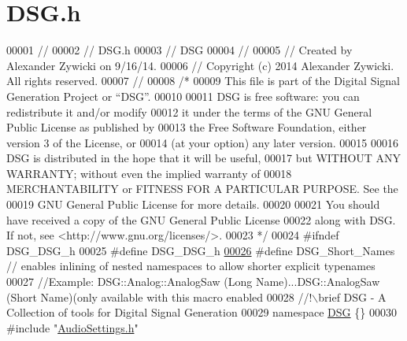 \hypertarget{_d_s_g_8h_source}{\section{D\+S\+G.\+h}
\label{_d_s_g_8h_source}
}

\begin{DoxyCode}
00001 \textcolor{comment}{//}
00002 \textcolor{comment}{//  DSG.h}
00003 \textcolor{comment}{//  DSG}
00004 \textcolor{comment}{//}
00005 \textcolor{comment}{//  Created by Alexander Zywicki on 9/16/14.}
00006 \textcolor{comment}{//  Copyright (c) 2014 Alexander Zywicki. All rights reserved.}
00007 \textcolor{comment}{//}
00008 \textcolor{comment}{/*}
00009 \textcolor{comment}{ This file is part of the Digital Signal Generation Project or “DSG”.}
00010 \textcolor{comment}{}
00011 \textcolor{comment}{ DSG is free software: you can redistribute it and/or modify}
00012 \textcolor{comment}{ it under the terms of the GNU General Public License as published by}
00013 \textcolor{comment}{ the Free Software Foundation, either version 3 of the License, or}
00014 \textcolor{comment}{ (at your option) any later version.}
00015 \textcolor{comment}{}
00016 \textcolor{comment}{ DSG is distributed in the hope that it will be useful,}
00017 \textcolor{comment}{ but WITHOUT ANY WARRANTY; without even the implied warranty of}
00018 \textcolor{comment}{ MERCHANTABILITY or FITNESS FOR A PARTICULAR PURPOSE.  See the}
00019 \textcolor{comment}{ GNU General Public License for more details.}
00020 \textcolor{comment}{}
00021 \textcolor{comment}{ You should have received a copy of the GNU General Public License}
00022 \textcolor{comment}{ along with DSG.  If not, see <http://www.gnu.org/licenses/>.}
00023 \textcolor{comment}{ */}
00024 \textcolor{preprocessor}{#ifndef DSG\_DSG\_h}
00025 \textcolor{preprocessor}{#define DSG\_DSG\_h}
\hypertarget{_d_s_g_8h_source_l00026}{}\hyperlink{_d_s_g_8h_a83f0da18914977ca7a09b93cb1f57a05}{00026} \textcolor{preprocessor}{#define DSG\_Short\_Names // enables inlining of nested namespaces to allow shorter explicit typenames}
00027 \textcolor{comment}{//Example: DSG::Analog::AnalogSaw (Long Name)...DSG::AnalogSaw (Short Name)(only available with this macro
       enabled}\textcolor{comment}{}
00028 \textcolor{comment}{//!\(\backslash\)brief DSG - A Collection of tools for Digital Signal Generation}
00029 \textcolor{comment}{}\textcolor{keyword}{namespace }\hyperlink{namespace_d_s_g}{DSG} \{\}
00030 \textcolor{preprocessor}{#include "\hyperlink{_audio_settings_8h}{AudioSettings.h}"}

\end{DoxyCode}
